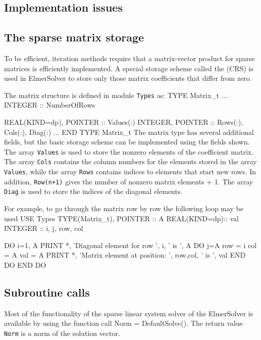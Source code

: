 \begin{versiona}

\section{Implementation issues}

\subsection{The sparse matrix storage}

To be efficient, iteration methods require that a matrix-vector product
for sparse matrices is efficiently implemented. A special
storage scheme called the  (CRS) \cite{Barrett93} is used in ElmerSolver
to store only those matrix coefficients that differ from zero.

The matrix structure is defined in module {\tt Types} as:
\ttbegin
  TYPE Matrix_t
     ...
    INTEGER :: NumberOfRows

    REAL(KIND=dp),  POINTER :: Values(:)
    INTEGER, POINTER :: Rows(:), Cols(:), Diag(:)
     ...
  END TYPE Matrix_t
\ttend
The matrix type has several additional fields, but the basic storage scheme can be implemented  
using the fields shown. The array {\tt Values} is used to store the nonzero elements of
the coefficient matrix. The array {\tt Cols} contains the column numbers for the elements 
stored in the array {\tt Values}, while the array {\tt Rows} contains indices to 
elements that start new rows. In addition, 
{\tt Row(n+1)} gives the number of nonzero matrix elements + 1. 
The array {\tt Diag} is used to store the indices of the diagonal elements. 

For example, to go through the matrix row by row the 
following loop may be used
\ttbegin
  USE Types
  TYPE(Matrix_t), POINTER :: A
  REAL(KIND=dp):: val
  INTEGER :: i, j, row, col

  DO i=1, A %
    PRINT *, 'Diagonal element for row ', i, ' is ', A %
    DO j=A %
       row = i
       col = A %
       val = A %
       PRINT *, 'Matrix element at position: ', row,col, ' is ', val
    END DO
  END DO
\ttend


\subsection{Subroutine calls}

Most of the functionality of the sparse linear system solver of the ElmerSolver is
available by using the function call
\ttbegin
  Norm = DefaultSolve().
\ttend
The return value {\tt Norm} is a norm of the solution vector.


\end{versiona}

